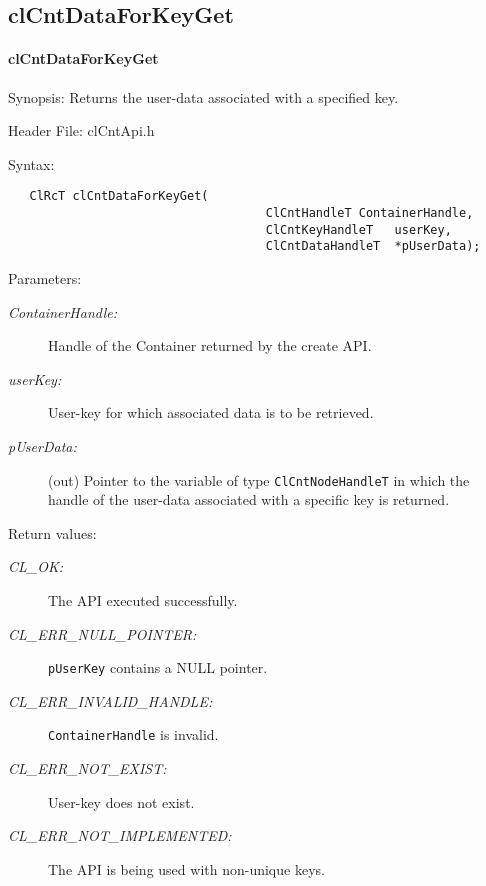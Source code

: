 \subsection{clCntDataForKeyGet}
\hypertarget{pagecnt116}{}\paragraph{cl\-Cnt\-Data\-For\-Key\-Get}\label{pagecnt116}
\begin{Desc}
\item[Synopsis:]Returns the user-data associated with a specified key.\end{Desc}
\begin{Desc}
\item[Header File:]clCntApi.h\end{Desc}
\begin{Desc}
\item[Syntax:]

\footnotesize\begin{verbatim}   ClRcT clCntDataForKeyGet(
                              		ClCntHandleT ContainerHandle,
                              		ClCntKeyHandleT   userKey,
                              		ClCntDataHandleT  *pUserData);
\end{verbatim}
\normalsize
\end{Desc}
\begin{Desc}
\item[Parameters:]
\begin{description}
\item[{\em Container\-Handle:}]Handle of the Container returned by the create API. 
\item[{\em user\-Key:}]User-key for which associated data is to be retrieved. 
\item[{\em p\-User\-Data:}](out) Pointer to the variable of type {\tt{ClCntNodeHandleT}} in which the handle of the user-data associated with a
specific key is returned.\end{description}
\end{Desc}
\begin{Desc}
\item[Return values:]
\begin{description}
\item[{\em CL\_\-OK:}]The API executed successfully. 
\item[{\em CL\_\-ERR\_\-NULL\_\-POINTER:}]{\tt{pUserKey}} contains a NULL pointer. 
\item[{\em CL\_\-ERR\_\-INVALID\_\-HANDLE:}]{\tt{ContainerHandle}} is invalid.
\item[{\em CL\_\-ERR\_\-NOT\_\-EXIST:}]User-key does not exist. 
\item[{\em CL\_\-ERR\_\-NOT\_\-IMPLEMENTED:}]The API is being used with non-unique keys.\end{description}
\end{Desc}
